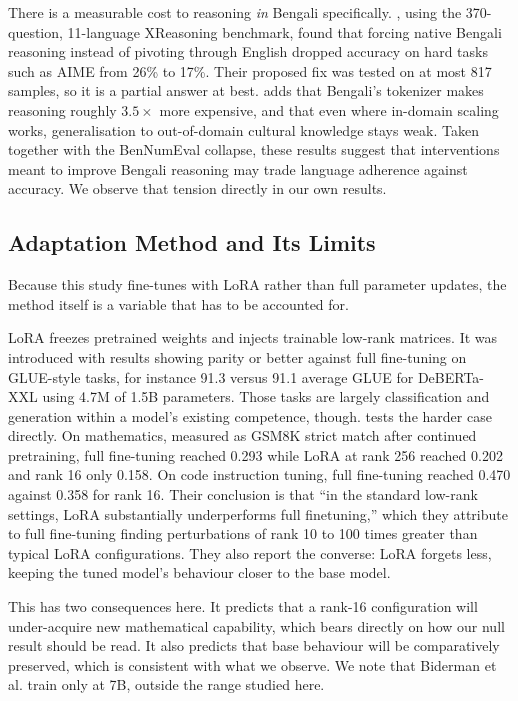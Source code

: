 \documentclass[10pt,twocolumn,letterpaper]{article}
\begin{document}
There is a measurable cost to reasoning \emph{in} Bengali specifically.
\textcite{qi2025xreasoning}, using the 370-question, 11-language XReasoning
benchmark, found that forcing native Bengali reasoning instead of pivoting
through English dropped accuracy on hard tasks such as AIME from 26\% to 17\%.
Their proposed fix was tested on at most 817 samples, so it is a partial answer
at best. \textcite{yong2025crosslingual} adds that Bengali's tokenizer makes
reasoning roughly $3.5\times$ more expensive, and that even where in-domain
scaling works, generalisation to out-of-domain cultural knowledge stays weak.
Taken together with the BenNumEval collapse, these results suggest that
interventions meant to improve Bengali reasoning may trade language adherence
against accuracy. We observe that tension directly in our own results.

\subsection{Adaptation Method and Its Limits}

Because this study fine-tunes with LoRA rather than full parameter updates, the
method itself is a variable that has to be accounted for.

LoRA \parencite{hu2021lora} %
freezes pretrained weights and injects trainable low-rank matrices. It was
introduced with results showing parity or better against full fine-tuning on
GLUE-style tasks, for instance 91.3 versus 91.1 average GLUE for DeBERTa-XXL
using 4.7M of 1.5B parameters. Those tasks are largely classification and
generation within a model's existing competence, though.
\textcite{biderman2024lora} %
tests the harder case directly. On mathematics, measured as GSM8K strict match
after continued pretraining, full fine-tuning reached 0.293 while LoRA at rank
256 reached 0.202 and rank 16 only 0.158. On code instruction tuning, full
fine-tuning reached 0.470 against 0.358 for rank 16. Their conclusion is that
``in the standard low-rank settings, LoRA substantially underperforms full
finetuning,'' which they attribute to full fine-tuning finding perturbations of
rank 10 to 100 times greater than typical LoRA configurations. They also report
the converse: LoRA forgets less, keeping the tuned model's behaviour closer to
the base model.

This has two consequences here. It predicts that a rank-16 configuration will
under-acquire new mathematical capability, which bears directly on how our null
result should be read. It also predicts that base behaviour will be
comparatively preserved, which is consistent with what we observe. We note that
Biderman et al. train only at 7B, outside the range studied here.
\end{document}
